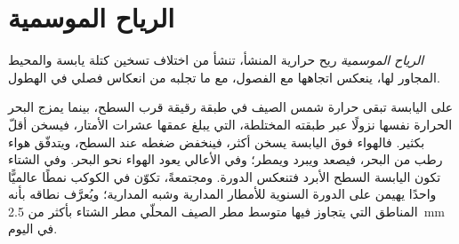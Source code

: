 \section{الرياح الموسمية}\label{sec:b2:climate-variability:monsoons}

\begin{definition}\label{def:b2:climate-variability:monsoon}
\emph{الرياح الموسمية} ريح حرارية المنشأ، تنشأ من اختلاف تسخين
كتلة يابسة والمحيط المجاور لها، ينعكس اتجاهها مع الفصول، مع ما تجلبه
من انعكاس فصلي في الهطول.
\end{definition}

على اليابسة تبقى حرارة شمس الصيف في طبقة رقيقة قرب السطح، بينما يمزج البحر
الحرارة نفسها نزولًا عبر طبقته المختلطة، التي يبلغ عمقها عشرات الأمتار، فيسخن أقلّ بكثير. فالهواء فوق
اليابسة يسخن أكثر، فينخفض ضغطه عند السطح، ويتدفّق هواء رطب من البحر، فيصعد ويبرد
ويمطر؛ وفي الأعالي يعود الهواء نحو البحر. وفي الشتاء تكون اليابسة السطح الأبرد فتنعكس
الدورة. ومجتمعةً، تكوّن  في الكوكب نمطًا عالميًّا واحدًا يهيمن على الدورة
السنوية للأمطار المدارية وشبه المدارية؛ ويُعرَّف نطاقه بأنه المناطق التي يتجاوز فيها متوسط مطر
الصيف المحلّي مطر الشتاء بأكثر من \qty{2.5}{mm} في اليوم.

